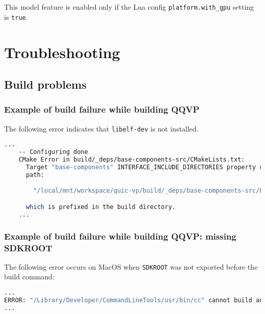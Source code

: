 This model feature is enabled only if the Lua config
{\small{\lstinline!platform.with_gpu!}} setting is {\small{\lstinline!true!}}.

\chapter{Troubleshooting}

\section{Build problems}

\subsection{Example of build failure while building QQVP}

The following error indicates that {\small{\lstinline!libelf-dev!}} is not installed.

\small
\begin{lstlisting}[language=bash]
    ...
    -- Configuring done
    CMake Error in build/_deps/base-components-src/CMakeLists.txt:
      Target "base-components" INTERFACE_INCLUDE_DIRECTORIES property contains
      path:

        "/local/mnt/workspace/quic-vp/build/_deps/base-components-src/LIBELF_INCLUDE_DIRS-NOTFOUND"

      which is prefixed in the build directory.
    ...
\end{lstlisting}
\normalsize

\subsection{Example of build failure while building QQVP: missing SDKROOT}
\label{sec:missingSDKROOT}

The following error occurs on MacOS when {\small{\lstinline!SDKROOT!}} was not
exported before the build command:

\small
\begin{lstlisting}[language=bash]
    ...
ERROR: "/Library/Developer/CommandLineTools/usr/bin/cc" cannot build an executable (is your linker broken?)
...
\end{lstlisting}
\normalsize

